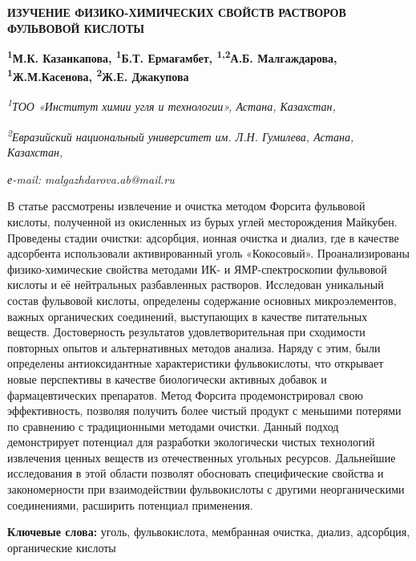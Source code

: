 \begin{articleheader}
{\bfseries ИЗУЧЕНИЕ ФИЗИКО-ХИМИЧЕСКИХ СВОЙСТВ РАСТВОРОВ ФУЛЬВОВОЙ КИСЛОТЫ}

{\bfseries
\textsuperscript{1}М.К. Казанкапова,
\textsuperscript{1}Б.Т. Ермағамбет,
\textsuperscript{1,2}А.Б. Малгаждарова\textsuperscript{\envelope },
\textsuperscript{1}Ж.М.Касенова,
\textsuperscript{2}Ж.Е. Джакупова}
\end{articleheader}

\begin{affiliation}
\emph{\textsuperscript{1}ТОО «Институт химии угля и технологии», Астана, Казахстан,}

\emph{\textsuperscript{2}Евразийский национальный университет им. Л.Н. Гумилева, Астана, Казахстан,}

\emph{е-mail: malgazhdarova.ab@mail.ru}
\end{affiliation}

В статье рассмотрены извлечение и очистка методом Форсита фульвовой
кислоты, полученной из окисленных из бурых углей месторождения Майкубен.
Проведены стадии очистки: адсорбция, ионная очистка и диализ, где в
качестве адсорбента использовали активированный уголь «Кокосовый».
Проанализированы физико-химические свойства методами ИК- и
ЯМР-спектроскопии фульвовой кислоты и её нейтральных разбавленных
растворов. Исследован уникальный состав фульвовой кислоты, определены
содержание основных микроэлементов, важных органических соединений,
выступающих в качестве питательных веществ. Достоверность результатов
удовлетворительная при сходимости повторных опытов и альтернативных
методов анализа. Наряду с этим, были определены антиоксидантные
характеристики фульвокислоты, что открывает новые перспективы в качестве
биологически активных добавок и фармацевтических препаратов. Метод
Форсита продемонстрировал свою эффективность, позволяя получить более
чистый продукт с меньшими потерями по сравнению с традиционными методами
очистки. Данный подход демонстрирует потенциал для разработки
экологически чистых технологий извлечения ценных веществ из
отечественных угольных ресурсов. Дальнейшие исследования в этой области
позволят обосновать специфические свойства и закономерности при
взаимодействии фульвокислоты с другими неорганическими соединениями,
расширить потенциал применения.

{\bfseries Ключевые слова:} уголь, фульвокислота, мембранная очистка,
диализ, адсорбция, органические кислоты

